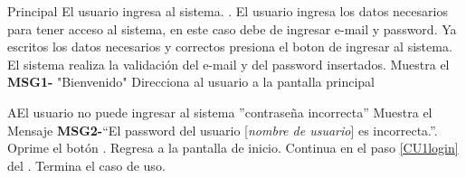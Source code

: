	\begin{UCtrayectoria}{Principal}
		\UCpaso[\UCactor] El usuario ingresa al sistema. \label{CU17Login}.
		\UCpaso[\UCactor] El usuario ingresa los datos necesarios para tener acceso al sistema, en este caso debe de ingresar e-mail y password.\label{CU1login} %
		\UCpaso[\UCactor] Ya escritos los datos necesarios y correctos presiona el boton de ingresar al sistema.%
		\UCpaso El sistema realiza la validación del e-mail y del password insertados.%
		\UCpaso Muestra el {\bf MSG1-} "Bienvenido"%
		\UCpaso Direcciona al usuario a la pantalla principal %
		
	\end{UCtrayectoria}
		
		\begin{UCtrayectoriaA}{A}{El usuario no puede ingresar al sistema ''contrase\~na incorrecta''}
			\UCpaso Muestra el Mensaje {\bf MSG2-}``El password del usuario [{\em nombre de usuario}] es incorrecta.''.
			\UCpaso[\UCactor] Oprime el botón .
			\UCpaso Regresa a la pantalla de inicio. 
			\UCpaso Continua en el paso \ref{CU1login} del .
			\UCpaso[] Termina el caso de uso.
		\end{UCtrayectoriaA}
		

